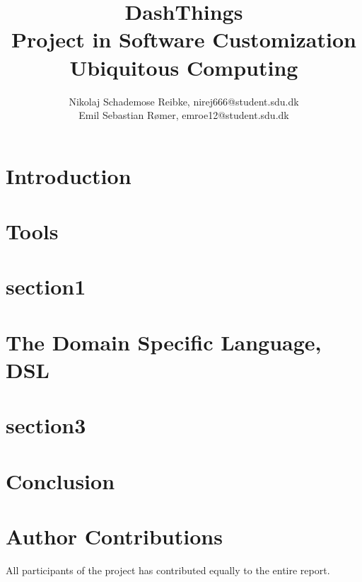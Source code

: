 \documentclass[10pt,a4paper,twocolumn]{article}
\begin{document}
\title{\textbf{DashThings \\ Project in Software Customization Ubiquitous Computing}}

\author{Nikolaj Schademose Reibke, nirej666@student.sdu.dk\\Emil Sebastian R{\o}mer, emroe12@student.sdu.dk}

\maketitle

\section{Introduction}


\section{Tools}


\section{section1}
%

\section{The Domain Specific Language, DSL}


\section{section3}
%

\section{Conclusion}


\appendix
\section{Author Contributions}
All participants of the project has contributed equally to the entire report.
\end{document}
